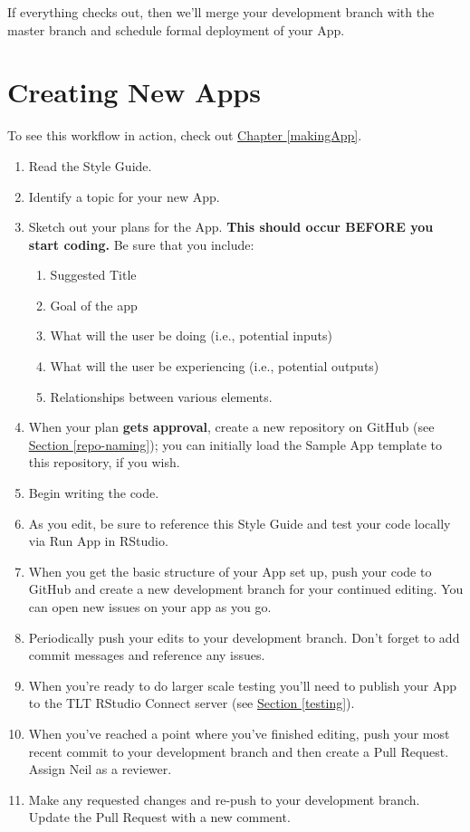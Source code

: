 \documentclass[
]{book}
\providecommand{\tightlist}{%
  \setlength{\itemsep}{0pt}\setlength{\parskip}{0pt}}
\begin{document}
If everything checks out, then we'll merge your development branch with the master branch and schedule formal deployment of your App.

\hypertarget{creating-new-apps}{%
\section{Creating New Apps}\label{creating-new-apps}}

To see this workflow in action, check out \protect\hyperlink{makingApp}{Chapter \ref{makingApp}}.

\begin{enumerate}
\def\labelenumi{\arabic{enumi}.}
\tightlist
\item
  Read the Style Guide.
\item
  Identify a topic for your new App.
\item
  Sketch out your plans for the App. \textbf{This should occur BEFORE you start coding.} Be sure that you include:

  \begin{enumerate}
  \def\labelenumii{\alph{enumii}.}
  \tightlist
  \item
    Suggested Title
  \item
    Goal of the app
  \item
    What will the user be doing (i.e., potential inputs)
  \item
    What will the user be experiencing (i.e., potential outputs)
  \item
    Relationships between various elements.
  \end{enumerate}
\item
  When your plan \textbf{gets approval}, create a new repository on GitHub (see \protect\hyperlink{repo-naming}{Section \ref{repo-naming}}); you can initially load the Sample App template to this repository, if you wish.
\item
  Begin writing the code.
\item
  As you edit, be sure to reference this Style Guide and test your code locally via Run App in RStudio.
\item
  When you get the basic structure of your App set up, push your code to GitHub and create a new development branch for your continued editing. You can open new issues on your app as you go.
\item
  Periodically push your edits to your development branch. Don't forget to add commit messages and reference any issues.
\item
  When you're ready to do larger scale testing you'll need to publish your App to the TLT RStudio Connect server (see \protect\hyperlink{testing}{Section \ref{testing}}).
\item
  When you've reached a point where you've finished editing, push your most recent commit to your development branch and then create a Pull Request. Assign Neil as a reviewer.
\item
  Make any requested changes and re-push to your development branch. Update the Pull Request with a new comment.
\end{enumerate}
\end{document}
